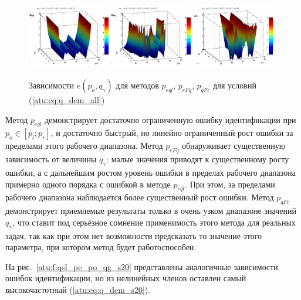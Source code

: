\begin{figure}[htb!]
  \centerline{
    \includegraphics[width=0.32\textwidth]{p/qls_pe-p_po_qg_eql_all.png}
    \hfill
    \includegraphics[width=0.32\textwidth]{p/qls_pe-p_po_qg_eFq_all.png}
    \hfill
    \includegraphics[width=0.32\textwidth]{p/qls_pe-p_po_qg_eFc_all.png}
  }
  \caption{Зависимости $e(p_o,q_\gamma)$ для методов $p_{eql}$, $p_{eFq}$, $p_{qFc}$ для условий (\ref{atu:eq:q_dem_all})}
  \label{atu:f:qsl_pe_po_qg_all}
\end{figure}

Метод $p_{eql}$ демонстрирует достаточно ограниченную ошибку идентификации
при $p_o \in [p_l; p_r]$, и достаточно быстрый, но линейно ограниченный рост ошибки
за пределами этого рабочего диапазона.
Метод $p_{eFq}$ обнаруживает существенную зависимость от величины $q_\gamma$:
малые значения %
приводят к существенному росту ошибки, а с дальнейшим ростом
уровень ошибки в пределах рабочего диапазона примерно
одного порядка с ошибкой в методе $p_{eql}$.
При этом, за пределами рабочего диапазона наблюдается более существенный рост ошибки.
Метод $p_{qFc}$ демонстрирует приемлемые результаты
только в очень узком диапазоне значений $q_\gamma$,
что ставит под серьёзное сомнение применимость этого метода
для реальных задач, так как при этом нет возможности предсказать
то значение этого параметра, при котором метод будет работоспособен.


На рис.~\ref{atu:f:qsl_pe_po_qg_s20} представлены аналогичные зависимости ошибок идентификации,
но из нелинейных членов оставлен самый высокочастотный (\ref{atu:eq:q_dem_s20}).

